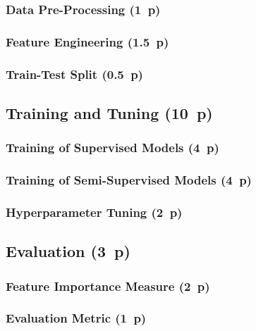 \subsubsection{Data Pre-Processing (1~p)}\label{sec:data-preprocessing}

\subsubsection{Feature Engineering (1.5~p)}\label{sec:feature-engineering}

\subsubsection{Train-Test Split (0.5~p)}\label{sec:train-test-split}

\subsection{Training and Tuning (10~p)}\label{sec:training-and-tuning}

\subsubsection{Training of Supervised
  Models (4~p)}\label{sec:training-of-supervised-models}


\subsubsection{Training of Semi-Supervised
  Models (4~p)}\label{sec:training-of-semi-supervised-models}


\subsubsection{Hyperparameter Tuning (2~p)}\label{sec:hyperparameter-tuning}


\subsection{Evaluation (3~p)}\label{sec:evaluation}

\subsubsection{Feature Importance
  Measure (2~p)}\label{sec:feature-importance-measure}

\subsubsection{Evaluation Metric (1~p)}\label{sec:evaluation-metric}


